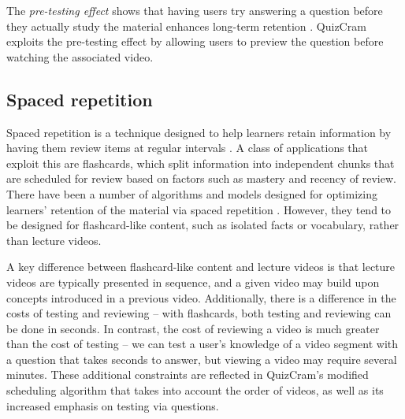 \documentclass{sigchi}
\begin{document}

The \emph{pre-testing effect} shows that having users try answering a question before they actually study the material enhances long-term retention \cite{pretesting}. QuizCram exploits the pre-testing effect by allowing users to preview the question before watching the associated video.

\subsection{Spaced repetition}

Spaced repetition is a technique designed to help learners retain information by having them review  items at regular intervals \cite{karpicke2011spaced}. A class of applications that exploit this are flashcards, which split information into independent chunks that are scheduled for review based on factors such as mastery and recency of review. There have been a number of algorithms and models designed for optimizing learners' retention of the material via spaced repetition \cite{optimalschedule} \cite{memreflex}. However, they tend to be designed for flashcard-like content, such as isolated facts or vocabulary, rather than lecture videos. %

A key difference between flashcard-like content and lecture videos is that lecture videos are typically presented in sequence, and a given video may build upon concepts introduced in a previous video. Additionally, there is a difference in the costs of testing and reviewing -- with flashcards, both testing and reviewing can be done in seconds. In contrast, the cost of reviewing a video is much greater than the cost of testing -- we can test a user's knowledge of a video segment with a question that takes seconds to answer, but viewing a video may require several minutes. These additional constraints are reflected in QuizCram's modified scheduling algorithm that takes into account the order of videos, as well as its increased emphasis on testing via questions.

\end{document}
